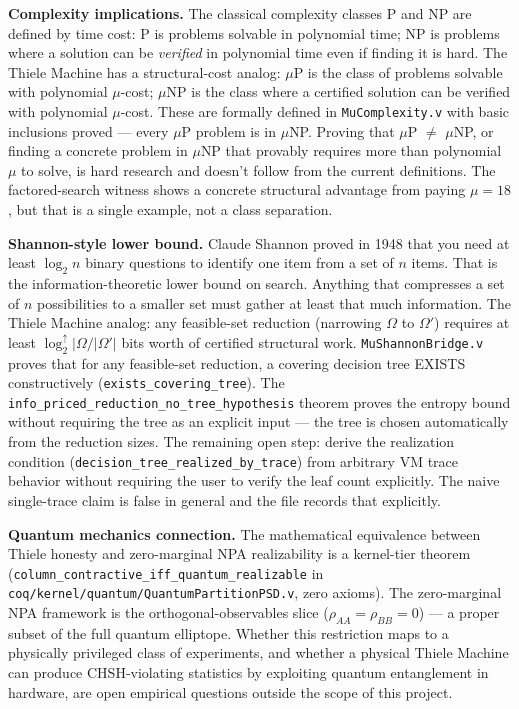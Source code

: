 \documentclass[11pt,a4paper]{article}
\theoremstyle{plain}
\theoremstyle{definition}
\theoremstyle{remark}
\begin{document}
\textbf{Complexity implications.} The classical complexity classes P and NP are defined by time cost: P is problems solvable in polynomial time; NP is problems where a solution can be \emph{verified} in polynomial time even if finding it is hard. The Thiele Machine has a structural-cost analog: $\mu$P is the class of problems solvable with polynomial $\mu$-cost; $\mu$NP is the class where a certified solution can be verified with polynomial $\mu$-cost. These are formally defined in \texttt{MuComplexity.v} with basic inclusions proved --- every $\mu$P problem is in $\mu$NP. Proving that $\mu$P $\neq$ $\mu$NP, or finding a concrete problem in $\mu$NP that provably requires more than polynomial $\mu$ to solve, is hard research and doesn't follow from the current definitions. The factored-search witness shows a concrete structural advantage from paying $\mu = 18$, but that is a single example, not a class separation.

\textbf{Shannon-style lower bound.} Claude Shannon proved in 1948 that you need at least $\log_2 n$ binary questions to identify one item from a set of $n$ items. That is the information-theoretic lower bound on search. Anything that compresses a set of $n$ possibilities to a smaller set must gather at least that much information. The Thiele Machine analog: any feasible-set reduction (narrowing $\Omega$ to $\Omega'$) requires at least $\log_2^{\uparrow}|\Omega / |\Omega'|$ bits worth of certified structural work. \texttt{MuShannonBridge.v} proves that for any feasible-set reduction, a covering decision tree EXISTS constructively (\texttt{exists\_covering\_tree}). The \texttt{info\_priced\_reduction\_no\_tree\_hypothesis} theorem proves the entropy bound without requiring the tree as an explicit input --- the tree is chosen automatically from the reduction sizes. The remaining open step: derive the realization condition (\texttt{decision\_tree\_realized\_by\_trace}) from arbitrary VM trace behavior without requiring the user to verify the leaf count explicitly. The naive single-trace claim is false in general and the file records that explicitly.

\textbf{Quantum mechanics connection.} The mathematical equivalence between Thiele honesty and zero-marginal NPA realizability is a kernel-tier theorem (\texttt{column\_contractive\_iff\_quantum\_realizable} in \texttt{coq/kernel/quantum/QuantumPartitionPSD.v}, zero axioms). The zero-marginal NPA framework is the orthogonal-observables slice ($\rho_{AA}=\rho_{BB}=0$) — a proper subset of the full quantum elliptope. Whether this restriction maps to a physically privileged class of experiments, and whether a physical Thiele Machine can produce CHSH-violating statistics by exploiting quantum entanglement in hardware, are open empirical questions outside the scope of this project.
\end{document}
